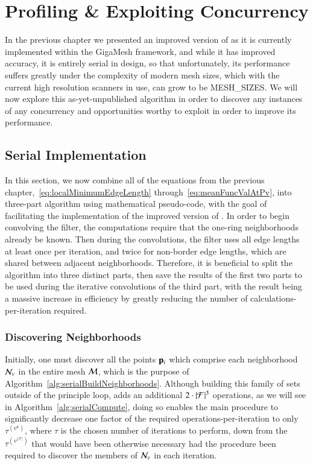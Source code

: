 \chapter{Profiling \& Exploiting Concurrency}
\label{ch5}
In the previous chapter we presented an improved version of  as it is currently implemented within the GigaMesh framework, and while it has improved accuracy, it is entirely serial in design, so that unfortunately, its performance suffers greatly under the complexity of modern mesh sizes, which with the current high resolution scanners in use, can grow to be MESH\_SIZES. We will now explore this as-yet-unpublished algorithm in order to discover any instances of any concurrency and opportunities worthy to exploit in order to improve its performance.

%
%
%
%
\section{Serial Implementation}
\label{ch5sSI}
In this section, we now combine all of the equations from the previous chapter,~\ref{eq:localMinimumEdgeLength} through~\ref{eq:meanFuncValAtPv}, into three-part algorithm using mathematical pseudo-code, with the goal of facilitating the implementation of the improved version of . In order to begin convolving the filter, the computations require that the one-ring neighborhoods already be known. Then during the convolutions, the filter uses all edge lengths at least once per iteration, and twice for non-border edge lengths, which are shared between adjacent neighborhoods. Therefore, it is beneficial to split the algorithm into three distinct parts, then save the results of the first two parts to be used during the iterative convolutions of the third part, with the result being a massive increase in efficiency by greatly reducing the number of calculations-per-iteration required.

%
%
%
\subsection{Discovering Neighborhoods}
\label{ch5sSIssDN}
Initially, one must discover all the points $\mathbf{p}_i$ which comprise each neighborhood $\mathcal{N}_v$ in the entire mesh $\mathcal{M}$, which is the purpose of Algorithm~\ref{alg:serialBuildNeighborhoods}. Although building this family of sets outside of the principle loop, adds an additional $2\cdot |\mathcal{F}|^3$ operations, as we will see in Algorithm~\ref{alg:serialCompute}, doing so enables 
the main procedure to significantly decrease one factor of the required operations-per-iteration to only $\tau^{(v^k)}$, where $\tau$ is the chosen number of iterations to perform, down from the $\tau^{(v^{|\mathcal{F}|})}$ that would have been otherwise necessary had the procedure been required to discover the members of $\mathcal{N}_v$ in each iteration.%
%

